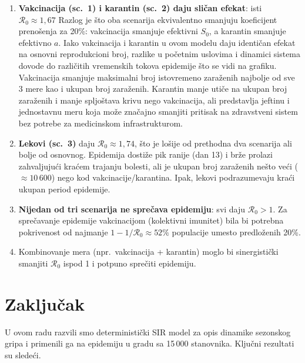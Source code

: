 \documentclass[12pt,a4paper]{article}
\begin{document}
	\begin{enumerate}
		\item \textbf{Vakcinacija (sc.\ 1) i karantin (sc.\ 2) daju sličan efekat}:
		isti $\mathcal{R}_0\approx 1{,}67$ Razlog je što oba scenarija ekvivalentno smanjuju koeficijent prenošenja za 20\%: vakcinacija smanjuje
		efektivni $S_0$, a karantin smanjuje efektivno $a$. Iako vakcinacija i karantin u ovom modelu daju identičan efekat na osnovni reprodukcioni broj, razlike u početnim uslovima i dinamici sistema dovode do različitih vremenskih tokova epidemije što se vidi na grafiku. Vakcinacija smanjuje maksimalni broj istovremeno zaraženih najbolje od sve 3 mere kao i ukupan broj zaraženih. Karantin manje utiče na ukupan broj zaraženih i manje spljoštava krivu nego vakcinacija, ali predstavlja jeftinu i jednostavnu meru koja može značajno smanjiti pritisak na zdravstveni sistem bez potrebe za medicinskom infrastrukturom.  
		
		\item \textbf{Lekovi (sc.\ 3)} daju $\mathcal{R}_0\approx 1{,}74$, što je lošije od
		prethodna dva scenarija ali bolje od osnovnog. Epidemija dostiže pik ranije (dan 13)
		i brže prolazi zahvaljujući kraćem trajanju bolesti, ali je ukupan broj zaraženih
		nešto veći ($\approx 10\,600$) nego kod vakcinacije/karantina. Ipak, lekovi
		podrazumevaju kraći ukupan period epidemije.
		
		\item \textbf{Nijedan od tri scenarija ne sprečava epidemiju}: svi daju $\mathcal{R}_0>1$.
		Za sprečavanje epidemije vakcinacijom (kolektivni imunitet) bila bi potrebna pokrivenost
		od najmanje $1-1/\mathcal{R}_0\approx 52\%$ populacije umesto predloženih 20\%.
		
		\item Kombinovanje mera (npr.\ vakcinacija + karantin) moglo bi sinergistički smanjiti
		$\mathcal{R}_0$ ispod 1 i potpuno sprečiti epidemiju.
	\end{enumerate}
	
	\section{Zaključak}
	\label{sec:zakljucak}
	
	U ovom radu razvili smo deterministički SIR model za opis dinamike sezonskog gripa i
	primenili ga na epidemiju u gradu sa 15\,000 stanovnika. Ključni rezultati su sledeći.
	
\end{document}
